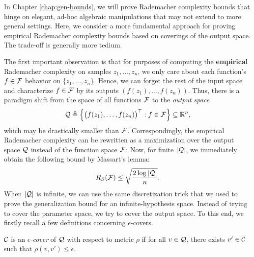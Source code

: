
In Chapter \ref{chap:gen-bounds}, we will prove Rademacher complexity bounds that hinge on elegant, ad-hoc algebraic manipulations that may not extend to more general settings. Here, we consider a more fundamental approach for proving empirical Rademacher complexity bounds based on coverings of the output space. The trade-off is generally more tedium.

The first important observation is that for purposes of computing the \textbf{empirical} Rademacher complexity on samples $z_1, ..., z_n$, 
we only care about each function's $f \in \mathcal F$ behavior on $\{z_1, ..., z_n\}$. Hence, we can forget the rest of the input space and characterize $f \in \mathcal F$ by its outputs $(f(z_1),\dots, f(z_n))$. Thus, there is a paradigm shift from the space of all functions $\mathcal F$ to the \textit{output space}
\begin{equation}
\mathcal Q \triangleq \left\{ \begin{pmatrix} f(z_1), \dots, f(z_n) \end{pmatrix}^\top: f\in \mathcal F\right\} \subseteq \mathbb R^n,
\end{equation}
which may be drastically smaller than $\mathcal F$. Correspondingly, the empirical Rademacher complexity can be rewritten as a maximization over the output space $\mathcal Q$ instead of the function space $\mathcal F$: 
Now, for finite $|\mathcal Q|$, we immediately obtain the following bound by Massart's lemma:
\begin{equation}
R_S(\mathcal F) \le \sqrt{\frac {2\log|\mathcal Q|} n}.
\end{equation}
When $|\mathcal Q|$ is infinite, we can use the same discretization trick that we used to prove the generalization bound for an infinite-hypothesis space. Instead of trying to cover the parameter space, we try to cover the output space. To this end, we firstly recall a few definitions concerning $\epsilon$-covers.

\begin{definition}
$\mathcal C$ is an \emph{$\epsilon$-cover} of $\mathcal Q$ with respect to metric $\rho$ if for all $v\in \mathcal Q$, there exists $v'\in \mathcal C $ such that $\rho(v,v')\le \epsilon$.
\end{definition}

